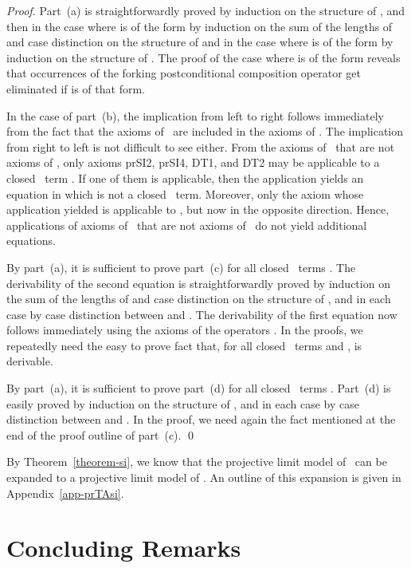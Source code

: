 \documentclass{llncs}
\begin{document}
\begin{proof}
Part~(a) is straightforwardly proved by induction on the structure of 
, and then in the case where  is of the form 
 by induction on the sum of the 
lengths of  and case distinction on the structure of 
 and in the case where  is of the form  by induction 
on the structure of .
The proof of the case where  is of the form
 reveals that occurrences of the 
forking postconditional composition operator get eliminated if  is of
that form.

In the case of part~(b), the implication from left to right follows 
immediately from the fact that the axioms of \prBTAnt\ are included in 
the axioms of \prTA.
The implication from right to left is not difficult to see either. 
From the axioms of \prTA\ that are not axioms of \prBTAnt, only axioms 
prSI2, prSI4, DT1, and DT2 may be applicable to a closed \prBTAnt\ term 
.
If one of them is applicable, then the application yields an equation 
 in which  is not a closed \prBTAnt\ term.
Moreover, only the axiom whose application yielded  is 
applicable to , but now in the opposite direction.
Hence, applications of axioms of \prTA\ that are not axioms of \prBTAnt\
do not yield additional equations.

By part~(a), it is sufficient to prove part~(c) for all closed \prBTAnt\ 
terms .
The derivability of the second equation is straightforwardly proved by 
induction on the sum of the lengths of  and case 
distinction on the structure of , and in each case by case 
distinction between  and .
The derivability of the first equation now follows immediately using the 
axioms of the operators .
In the proofs, we repeatedly need the easy to prove fact that, for all 
closed \prBTAnt\ terms  and , 
 is derivable.

By part~(a), it is sufficient to prove part~(d) for all closed \prBTAnt\ 
terms .
Part~(d) is easily proved by induction on the structure of , and in 
each case by case distinction between  and .
In the proof, we need again the fact mentioned at the end of the proof
outline of part~(c).
\qed
\end{proof}

By Theorem~\ref{theorem-si}, we know that the projective limit model 
of \prBTAnt\ can be expanded to a projective limit model of \prTA.
An outline of this expansion is given in Appendix~\ref{app-prTAsi}.

\section{Concluding Remarks}
\label{sect-concl}
\end{document}
